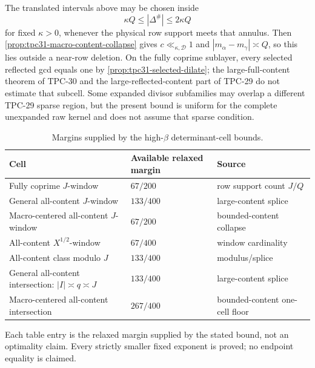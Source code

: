 The translated intervals above may be chosen inside
\begin{equation}
 \kappa Q\le|\Delta^\#|\le2\kappa Q
 \label{eq:tpc31-high-macro-center}
\end{equation}
for fixed $\kappa>0$, whenever the physical row support meets that
annulus.  Then \cref{prop:tpc31-macro-content-collapse} gives
$c\ll_{\kappa,\mathscr D}1$ and
$|m_\alpha-m_\gamma|\asymp Q$, so this lies outside a near-row
deletion.  On the fully coprime sublayer, every selected reflected gcd
equals one by \cref{prop:tpc31-selected-dilate}; the
large-full-content theorem of TPC-30 and the large-reflected-content
part of TPC-29 do not estimate that subcell.  Some expanded divisor subfamilies may overlap a
different TPC-29 sparse region, but the present bound is uniform for
the complete unexpanded raw kernel and does not assume that sparse
condition.

\begin{table}[H]
\centering
\caption{Margins supplied by the high-$\beta$ determinant-cell bounds.}
\label{tab:tpc31-high-ledger}
\begin{tabular}{@{}
 >{\raggedright\arraybackslash}p{}
 >{\centering\arraybackslash}p{}
 >{\raggedright\arraybackslash}p{}@{}}
\toprule
Cell & Available relaxed margin & Source \\
\midrule
Fully coprime $J$-window
& $67/200$ & row support count $J/Q$ \\
General all-content $J$-window
& $133/400$ & large-content splice \\
Macro-centered all-content $J$-window
& $67/200$ & bounded-content collapse \\
All-content $X^{1/2}$-window
& $67/400$ & window cardinality \\
All-content class modulo $J$
& $133/400$ & modulus/splice \\
General all-content intersection: $|I|\asymp q\asymp J$
& $133/400$ & large-content splice \\
Macro-centered all-content intersection
& $267/400$ & bounded-content one-cell floor \\
\bottomrule
\end{tabular}
\end{table}

Each table entry is the relaxed margin supplied by the stated bound,
not an optimality claim.  Every strictly smaller fixed exponent is
proved; no endpoint equality is claimed.
